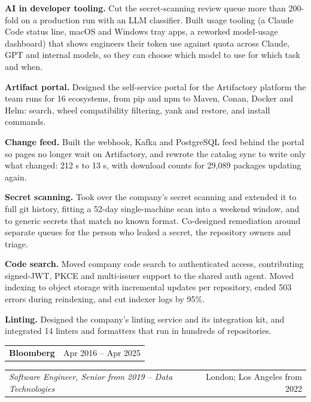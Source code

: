 \documentclass[10pt]{article}
\makeatletter
\newcommand{\entry}{\needspace{6\baselineskip}}
\newcommand{\twoColumns}[2]{%
  \noindent
  \begin{tabularx}{\textwidth}{@{}X r@{}}#2 & {\color{muted}#1}\\
  \end{tabularx}\par
}
\newcommand{\localsep}{\par}
\makeatother
\begin{document}
\begin{points}
\item \textbf{AI in developer tooling.} Cut the secret-scanning review queue more than 200-fold on a production run
  with an LLM classifier. Built usage tooling (a Claude Code status line, macOS and Windows tray
  apps, a reworked model-usage dashboard) that shows engineers their token use against quota across Claude, GPT and
  internal models, so they can choose which model to use for which task and when.
\item \textbf{Artifact portal.} Designed the self-service portal for the Artifactory platform the team runs for 16
  ecosystems, from pip and npm to Maven, Conan, Docker and Helm: search, wheel compatibility filtering, yank and
  restore, and install commands.
\item \textbf{Change feed.} Built the webhook, Kafka and PostgreSQL feed behind the portal so pages no longer wait on
  Artifactory, and rewrote the catalog sync to write only what changed: 212 s to 13 s, with download counts for
  29{,}089 packages updating again.
\item \textbf{Secret scanning.} Took over the company's secret scanning and extended it to full git history,
  fitting a 52-day single-machine scan into a weekend window, and to generic secrets that match no known format.
  Co-designed remediation around separate queues for the person who leaked a secret, the repository owners and triage.
\item \textbf{Code search.} Moved company code search to authenticated access, contributing signed-JWT, PKCE and
  multi-issuer support to the shared auth agent. Moved indexing to object storage with incremental updates per
  repository, ended 503 errors during reindexing, and cut indexer logs by 95\%.
\item \textbf{Linting.} Designed the company's linting service and its integration kit, and integrated 14 linters
  and formatters that run in hundreds of repositories.
\end{points}

\localsep%
\vspace{4pt}

\entry%
\twoColumns{Apr 2016 -- Apr 2025}{ \textbf{Bloomberg} }
\twoColumns{London; Los Angeles from 2022}{ \emph{Software Engineer, Senior from 2019 -- Data Technologies} }
\end{document}
